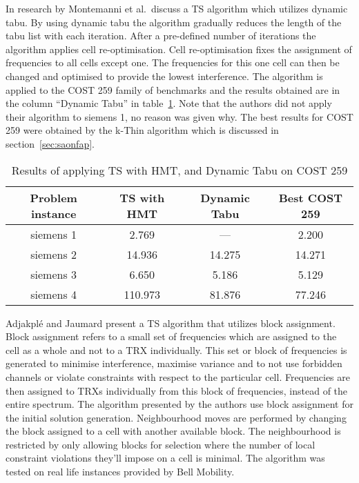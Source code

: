 In research by Montemanni et al.\ discuss a \gls{TS} algorithm which utilizes dynamic tabu\cite{MontiTS}. By using dynamic tabu the algorithm gradually reduces the length of the tabu list with each iteration. After a pre-defined number of iterations the algorithm applies cell re-optimisation. Cell re-optimisation fixes the assignment of frequencies to all cells except one. The frequencies for this one cell can then be changed and optimised to provide the lowest interference\cite{MontiTS}. The algorithm is applied to the COST 259 family of benchmarks and the results obtained are in the column ``Dynamic Tabu'' in table~\ref{TSCOST259}. Note that the authors did not apply their algorithm to siemens 1, no reason was given why. The best results for \gls{COST} 259 were obtained by the k-Thin algorithm which is discussed in section~\ref{sec:saonfap}.
\begin{table}[H]
\centering
	\begin{tabular}{| c | c | c | c |}
		\hline
        Problem instance & \gls{TS} with HMT & Dynamic Tabu & Best COST 259 \\ \hline
        siemens 1 & 2.769 & --- & 2.200 \\ \hline
        siemens 2 & 14.936 & 14.275 & 14.271 \\ \hline
        siemens 3 & 6.650 & 5.186 & 5.129 \\ \hline
        siemens 4 & 110.973 & 81.876 & 77.246 \\ \hline
	\end{tabular}
\caption{Results of applying \gls{TS} with HMT, and Dynamic Tabu on COST 259}
\label{TSCOST259}
\end{table}

Adjakpl\'{e} and Jaumard present a TS algorithm that utilizes block assignment\cite{AdJa97}. Block assignment refers to a small set of frequencies which are assigned to the cell as a whole and not to a TRX individually. This set or block of frequencies is generated to minimise interference, maximise variance and to not use forbidden channels or violate constraints with respect to the particular cell. Frequencies are then assigned to TRXs individually from this block of frequencies, instead of the entire spectrum. The algorithm presented by the authors use block assignment for the initial solution generation. Neighbourhood moves are performed by changing the block assigned to a cell with another available block. The neighbourhood is restricted by only allowing blocks for selection where the number of local constraint violations they'll impose on a cell is minimal. The algorithm was tested on real life instances provided by Bell Mobility.

